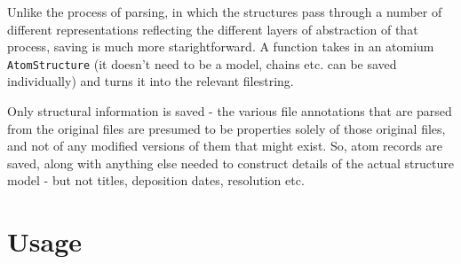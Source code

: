 Unlike the process of parsing, in which the structures pass through a number of different representations reflecting the different layers of abstraction of that process, saving is much more starightforward. A function takes in an atomium \texttt{AtomStructure} (it doesn't need to be a model, chains etc. can be saved individually) and turns it into the relevant filestring.

Only structural information is saved - the various file annotations that are parsed from the original files are presumed to be properties solely of those original files, and not of any modified versions of them that might exist. So, atom records are saved, along with anything else needed to construct details of the actual structure model - but not titles, deposition dates, resolution etc.

\section{Usage}

